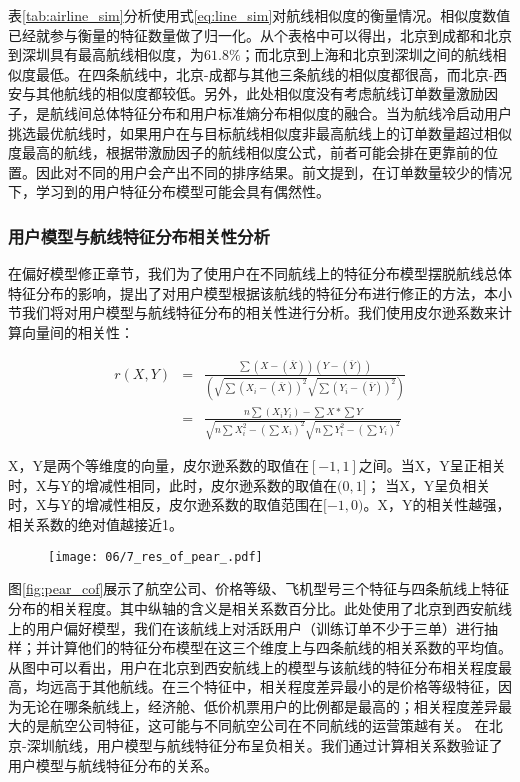 表\ref{tab:airline_sim}分析使用式\ref{eq:line_sim}对航线相似度的衡量情况。相似度数值已经就参与衡量的特征数量做了归一化。从个表格中可以得出，北京到成都和北京到深圳具有最高航线相似度，为$61.8\%$；而北京到上海和北京到深圳之间的航线相似度最低。在四条航线中，北京-成都与其他三条航线的相似度都很高，而北京-西安与其他航线的相似度都较低。另外，此处相似度没有考虑航线订单数量激励因子，是航线间总体特征分布和用户标准熵分布相似度的融合。当为航线冷启动用户挑选最优航线时，如果用户在与目标航线相似度非最高航线上的订单数量超过相似度最高的航线，根据带激励因子的航线相似度公式，前者可能会排在更靠前的位置。因此对不同的用户会产出不同的排序结果。前文提到，在订单数量较少的情况下，学习到的用户特征分布模型可能会具有偶然性。

\subsubsection{用户模型与航线特征分布相关性分析}

在偏好模型修正章节，我们为了使用户在不同航线上的特征分布模型摆脱航线总体特征分布的影响，提出了对用户模型根据该航线的特征分布进行修正的方法，本小节我们将对用户模型与航线特征分布的相关性进行分析。我们使用皮尔逊系数来计算向量间的相关性：

\begin{eqnarray}
	r(X,Y)  & = & \frac{\sum(X-(\overline{X}))(Y-(\overline{Y}))}{(\sqrt{\sum(X_i-(\overline{X}))^2}\sqrt{\sum(Y_i-(\overline{Y}))^2})} \nonumber \\
	& = & \frac{n\sum(X_iY_i)-\sum X *\sum Y}{\sqrt{n\sum X_i^2 - (\sum X_i)^2}\sqrt{n\sum Y_i^2 - (\sum Y_i)^2}}
\end{eqnarray}

X，Y是两个等维度的向量，皮尔逊系数的取值在$[-1,1]$之间。当X，Y呈正相关时，X与Y的增减性相同，此时，皮尔逊系数的取值在$(0,1]$；
当X，Y呈负相关时，X与Y的增减性相反，皮尔逊系数的取值范围在$[-1,0)$。X，Y的相关性越强，相关系数的绝对值越接近1。

\begin{figure}
 \centering
 \texttt{[image: 06/7\_res\_of\_pear\_.pdf]}
\end{figure}

图\ref{fig:pear_cof}展示了航空公司、价格等级、飞机型号三个特征与四条航线上特征分布的相关程度。其中纵轴的含义是相关系数百分比。此处使用了北京到西安航线上的用户偏好模型，我们在该航线上对活跃用户（训练订单不少于三单）进行抽样；并计算他们的特征分布模型在这三个维度上与四条航线的相关系数的平均值。从图中可以看出，用户在北京到西安航线上的模型与该航线的特征分布相关程度最高，均远高于其他航线。在三个特征中，相关程度差异最小的是价格等级特征，因为无论在哪条航线上，经济舱、低价机票用户的比例都是最高的；相关程度差异最大的是航空公司特征，这可能与不同航空公司在不同航线的运营策越有关。
在北京-深圳航线，用户模型与航线特征分布呈负相关。我们通过计算相关系数验证了用户模型与航线特征分布的关系。

